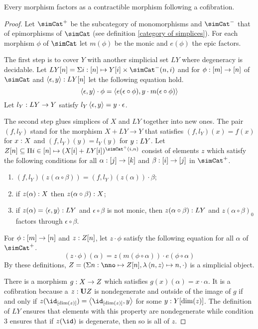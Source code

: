 \documentclass[csh.tex]{subfiles}
\begin{document}
\begin{proposition} Every morphism factors as a contractible morphism following a cofibration. \label{factor1} \end{proposition}

\begin{proof}  
Let $\simCat^+$ be the subcategory of monomorphisms and $\simCat^-$ that of epimorphisms of $\simCat$ (see definition \ref{category of simplices}). For each morphism $\phi$ of $\simCat$ let $m(\phi)$ be the monic and $e(\phi)$ the epic factors.

The first step is to cover $Y$ with another simplicial set $LY$ where degeneracy is decidable.
Let $LY[n] = \coproduct{i\of[n]}{Y[i]\times\simCat^-(n,i)}$ and for $\phi: [m]\to [n]$ of $\simCat$ and $\left\langle \epsilon,y \right\rangle: LY[n]$ let the following equation hold.
\[\left\langle \epsilon,y \right\rangle\cdot \phi=\left\langle e(\epsilon\circ \phi),y\cdot m(\epsilon\circ\phi) \right\rangle\]
Let $l_Y: LY\to Y$ satisfy $l_Y\left\langle \epsilon,y \right\rangle=y\cdot\epsilon$.

The second step glues simplices of $X$ and $LY$ together into new ones.
The pair $(f,l_Y)$ stand for the morphism $X+LY\to Y$ that satisfies $(f,l_Y)(x)=f(x)$ for $x: X$ and $(f,l_Y)(y) = l_Y(y)$ for $y: LY$. Let $Z[n]\subseteq \product{i\in[n]}{(X[i]+LY[i])^{\simCat^+(i,n)}}$ consist of elements $z$ which satisfy the following conditions for all $\alpha: [j]\to [k]$ and $\beta: [i]\to[j]$ in $\simCat^+$.
\begin{enumerate}
\item $(f,l_Y)(z(\alpha\circ\beta)) = (f,l_Y)(z(\alpha))\cdot\beta$;
\item if $z(\alpha): X$ then $z(\alpha\circ\beta): X$;
\item if $z(\alpha)=\left\langle \epsilon,y \right\rangle: LY$ and $\epsilon\circ\beta$ is not monic, then $z(\alpha\circ\beta): LY$ and $z(\alpha\circ\beta)_0$ factors through $\epsilon\circ\beta$.
\end{enumerate}
For $\phi:[m]\to [n]$ and $z: Z[n]$, let $z\cdot\phi$ satisfy the following equation for all $\alpha$ of $\simCat^+$.
\[ (z\cdot\phi)(\alpha) = z(m(\phi\circ\alpha))\cdot e(\phi\circ \alpha) \]
By these definitions, $Z=(\coproduct{n\of\nno}{Z[n]},\function{\tuplet{n,z}}n,\cdot)$ is a simplicial object.

There is a morphism $g: X\to Z$ which satisfies $g(x)(\alpha) = x\cdot\alpha$. It is a cofibration because a $z:\mathbf{U} Z$ is nondegenerate and outside of the image of $g$ if and only if $z(\id_{[\dim(z)]}) = \tuplet{\id_{[\dim(z)]},y}$ for some $y: Y[\dim(z)]$. The definition of $LY$ ensures that elements with this property are nondegenerate while condition 3 ensures that if $z(\id)$ is degenerate, then so is all of $z$.


\end{proof}
\end{document}

